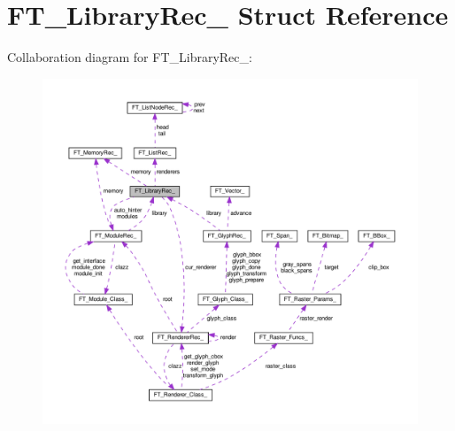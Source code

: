 \hypertarget{structFT__LibraryRec__}{}\section{F\+T\+\_\+\+Library\+Rec\+\_\+ Struct Reference}
\label{structFT__LibraryRec__}


Collaboration diagram for F\+T\+\_\+\+Library\+Rec\+\_\+\+:
\nopagebreak
\begin{figure}[H]
\begin{center}
\leavevmode
\includegraphics[width=350pt]{structFT__LibraryRec____coll__graph}
\end{center}
\end{figure}
